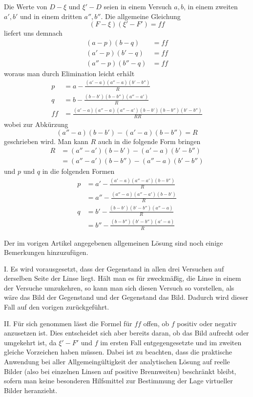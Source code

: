 Die Werte von $D-\xi$ und $\xi'-D$ seien in einem Versuch $a,b$, in einem zweiten $a',b'$ und in einem dritten $a'',b''$. Die allgemeine Gleichung
\[
(F-\xi)(\xi'-F')=ff
\]
liefert uns demnach
\[
\begin{aligned}
(a-p)(b-q)&=ff\\
(a'-p)(b'-q)&=ff\\
(a''-p)(b''-q)&=ff
\end{aligned}
\]
woraus man durch Elimination leicht erhält
\[
\begin{aligned}
p&=a-\frac{(a'-a)(a''-a)(b'-b'')}{R}\\
q&=b-\frac{(b-b')(b-b'')(a''-a')}{R}\\
ff&=\frac{(a'-a)(a''-a)(a''-a')(b-b')(b-b'')(b'-b'')}{RR}
\end{aligned}
\]
wobei zur Abkürzung
\[
(a''-a)(b-b')-(a'-a)(b-b'')=R
\]
geschrieben wird. Man kann $R$ auch in die folgende Form bringen
\[
\begin{aligned}
R&=(a''-a')(b-b')-(a'-a)(b'-b'')\\
&=(a''-a')(b-b'')-(a''-a)(b'-b'')
\end{aligned}
\]
und $p$ und $q$ in die folgenden Formen
\[
\begin{aligned}
p&=a'-\frac{(a'-a)(a''-a')(b-b'')}{R}\\
&=a''-\frac{(a''-a)(a''-a')(b-b')}{R}\\
q&=b'-\frac{(b-b')(b'-b'')(a''-a)}{R}\\
&=b''-\frac{(b-b'')(b'-b'')(a'-a)}{R}
\end{aligned}
\]

Der im vorigen Artikel angegebenen allgemeinen Lösung sind noch einige Bemerkungen hinzuzufügen.

I. Es wird vorausgesetzt, dass der Gegenstand in allen drei Versuchen auf derselben Seite der Linse liegt. Hält man es für zweckmäßig, die Linse in einem der Versuche umzukehren, so kann man sich diesen Versuch so vorstellen, als wäre das Bild der Gegenstand und der Gegenstand das Bild. Dadurch wird dieser Fall auf den vorigen zurückgeführt.

II. Für sich genommen lässt die Formel für $ff$ offen, ob $f$ positiv oder negativ anzusetzen ist. Dies entscheidet sich aber bereits daran, ob das Bild aufrecht oder umgekehrt ist, da $\xi'-F'$ und $f$ im ersten Fall entgegengesetzte und im zweiten gleiche Vorzeichen haben müssen. Dabei ist zu beachten, dass die praktische Anwendung bei aller Allgemeingültigkeit der analytischen Lösung auf reelle Bilder (also bei einzelnen Linsen auf positive Brennweiten) beschränkt bleibt, sofern man keine besonderen Hilfsmittel zur Bestimmung der Lage virtueller Bilder heranzieht.

